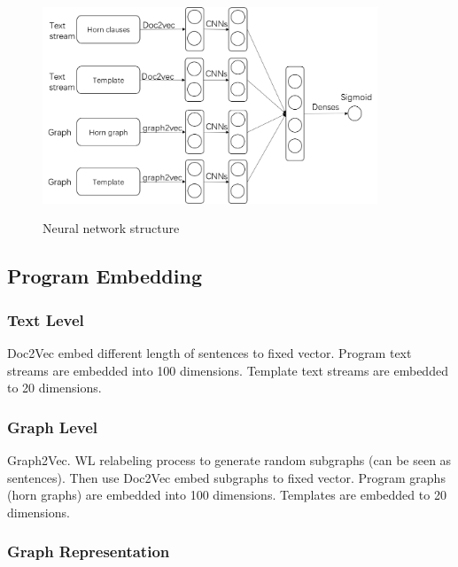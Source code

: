 \documentclass{article}
\begin{document}
\begin{figure}[h]
\centering
  \includegraphics[width=10cm]{graph/NNstructure}\\
  \caption{Neural network structure}\label{NNstructure}
\end{figure}
\subsection{Program Embedding}

\subsubsection{Text Level}
Doc2Vec \cite{DBLP:journals/corr/LeM14} embed different length of sentences to fixed vector.
Program text streams are embedded into 100 dimensions. Template text streams are embedded to 20 dimensions.
\subsubsection{Graph Level}
Graph2Vec\cite{DBLP:journals/corr/NarayananCVCLJ17}.
WL relabeling process \cite{WL_relabeling_process} to generate random subgraphs (can be seen as sentences). Then use Doc2Vec embed subgraphs to fixed vector.
Program graphs (horn graphs) are embedded into 100 dimensions. Templates are embedded to 20 dimensions.
\subsubsection{Graph Representation}
\end{document}
